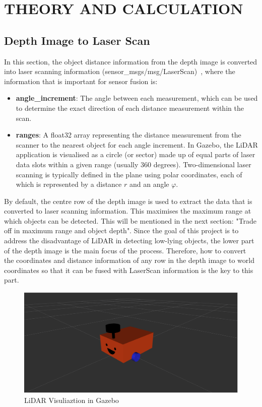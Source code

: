 \section{THEORY AND CALCULATION}
\label{sec:theory_and_calculation}
\subsection{Depth Image to Laser Scan}
In this section, the object distance information from the depth image is converted into laser scanning information (sensor\_msgs/msg/LaserScan)~\cite{laserscan}, 
where the information that is important for sensor fusion is:
\begin{itemize}[leftmargin=*]
    \item \textbf{angle\_increment}: The angle between each measurement, 
    which can be used to determine the exact direction of each distance measurement within the scan. 
    \item \textbf{ranges}: A float32 array representing the distance measurement from the scanner to the nearest object for each angle increment. 
    In Gazebo, the LiDAR application is visualised as a circle (or sector) made up of equal parts of laser data slots within a given range (usually $360$ degrees). 
    Two-dimensional laser scanning is typically defined in the plane using polar coordinates, each of which is represented by a distance $r$ and an angle $\varphi$.
\end{itemize}
By default, the centre row of the depth image is used to extract the data that is converted to laser scanning information. 
This maximises the maximum range at which objects can be detected. 
This will be mentioned in the next section: "Trade off in maximum range and object depth". 
Since the goal of this project is to address the disadvantage of LiDAR in detecting low-lying objects, 
the lower part of the depth image is the main focus of the process. 
Therefore, how to convert the coordinates and distance information of any row in the depth image to world coordinates 
so that it can be fused with LaserScan information is the key to this part.

\begin{figure}[H]
    \centering
    \includegraphics[width=0.8\linewidth]{figs/robot.png}
    \caption{LiDAR Visuliaztion in Gazebo}
\end{figure}

